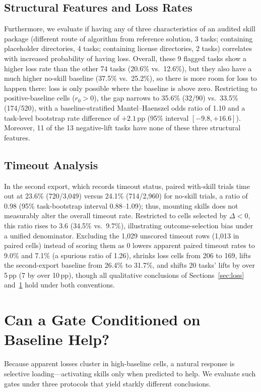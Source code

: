 \documentclass[10pt,conference]{IEEEtran}
\begin{document}
\subsection{Structural Features and Loss Rates}
Furthermore, we evaluate if having any of three characteristics of an audited skill package (different route of algorithm from reference solution, 3 tasks; containing placeholder directories, 4 tasks; containing license directories, 2 tasks) correlates with increased probability of having loss. Overall, these 9 flagged tasks show a higher loss rate than the other 74 tasks (20.6\% vs.\ 12.6\%), but they also have a much higher no-skill baseline (37.5\% vs.\ 25.2\%), so there is more room for loss to happen there: loss is only possible where the baseline is above zero. Restricting to positive-baseline cells ($r_{0}>0$), the gap narrows to 35.6\% (32/90) vs.~33.5\% (174/520), with a baseline-stratified Mantel--Haenszel odds ratio of 1.10 and a task-level bootstrap rate difference of $+2.1$\,pp (95\% interval $[-9.8,+16.6]$). Moreover, 11 of the 13 negative-lift tasks have none of these three structural features.

\subsection{Timeout Analysis}
In the second export, which records timeout status, paired with-skill trials time out at 23.6\% (720/3,049) versus 24.1\% (714/2,960) for no-skill trials, a ratio of 0.98 (95\% task-bootstrap interval 0.88--1.09); thus, mounting skills does not measurably alter the overall timeout rate. Restricted to cells selected by $\Delta<0$, this ratio rises to 3.6 (34.5\% vs.\ 9.7\%), illustrating outcome-selection bias under a unified denominator. Excluding the 1,029 unscored timeout rows (1,013 in paired cells) instead of scoring them as 0 lowers apparent paired timeout rates to 9.0\% and 7.1\% (a spurious ratio of 1.26), shrinks loss cells from 206 to 169, lifts the second-export baseline from 26.4\% to 31.7\%, and shifts 20 tasks' lifts by over 5\,pp (7 by over 10\,pp), though all qualitative conclusions of Sections~\ref{sec:loss} and~\ref{sec:gate} hold under both conventions.

\section{Can a Gate Conditioned on Baseline Help?}
\label{sec:gate}
Because apparent losses cluster in high-baseline cells, a natural response is selective loading---activating skills only when predicted to help. We evaluate such gates under three protocols that yield starkly different conclusions.
\end{document}
